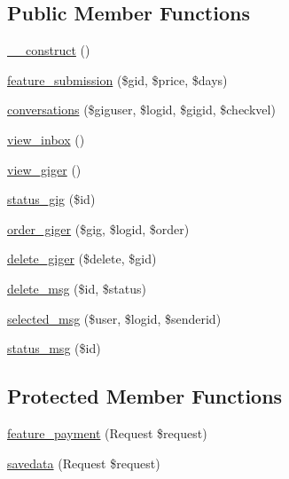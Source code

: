 \subsection*{Public Member Functions}
\begin{DoxyCompactItemize}
\item 
\mbox{\hyperlink{class_responsive_1_1_http_1_1_controllers_1_1_conversations_controller_a095c5d389db211932136b53f25f39685}{\+\_\+\+\_\+construct}} ()
\item 
\mbox{\hyperlink{class_responsive_1_1_http_1_1_controllers_1_1_conversations_controller_a921faa23a279afa2856d43c2d26ca47a}{feature\+\_\+submission}} (\$gid, \$price, \$days)
\item 
\mbox{\hyperlink{class_responsive_1_1_http_1_1_controllers_1_1_conversations_controller_a485a3199a3b013918780405a40c2a22a}{conversations}} (\$giguser, \$logid, \$gigid, \$checkvel)
\item 
\mbox{\hyperlink{class_responsive_1_1_http_1_1_controllers_1_1_conversations_controller_aecbd262429c2f29323f987e3dfb7492e}{view\+\_\+inbox}} ()
\item 
\mbox{\hyperlink{class_responsive_1_1_http_1_1_controllers_1_1_conversations_controller_a5ed047844f3523b725faba37c509cfa8}{view\+\_\+giger}} ()
\item 
\mbox{\hyperlink{class_responsive_1_1_http_1_1_controllers_1_1_conversations_controller_a44785abb897301d19c1d926e986a5d1a}{status\+\_\+gig}} (\$id)
\item 
\mbox{\hyperlink{class_responsive_1_1_http_1_1_controllers_1_1_conversations_controller_a4443ea658fd0a7bd8e7c965dbe01506b}{order\+\_\+giger}} (\$gig, \$logid, \$order)
\item 
\mbox{\hyperlink{class_responsive_1_1_http_1_1_controllers_1_1_conversations_controller_adbb0bfe2b6aeebed2625fb603fd28140}{delete\+\_\+giger}} (\$delete, \$gid)
\item 
\mbox{\hyperlink{class_responsive_1_1_http_1_1_controllers_1_1_conversations_controller_ae83cc7dd192f1277ab3c9fae0b06bc29}{delete\+\_\+msg}} (\$id, \$status)
\item 
\mbox{\hyperlink{class_responsive_1_1_http_1_1_controllers_1_1_conversations_controller_ac026994ca8740ecc3a3963c8036e3964}{selected\+\_\+msg}} (\$user, \$logid, \$senderid)
\item 
\mbox{\hyperlink{class_responsive_1_1_http_1_1_controllers_1_1_conversations_controller_adf1139707745e57d581271a95ccb0439}{status\+\_\+msg}} (\$id)
\end{DoxyCompactItemize}
\subsection*{Protected Member Functions}
\begin{DoxyCompactItemize}
\item 
\mbox{\hyperlink{class_responsive_1_1_http_1_1_controllers_1_1_conversations_controller_a3f2142e6e6fb43d3eaca613ea45be546}{feature\+\_\+payment}} (Request \$request)
\item 
\mbox{\hyperlink{class_responsive_1_1_http_1_1_controllers_1_1_conversations_controller_a39992cc1c190dd16b2de573a70a7f5dc}{savedata}} (Request \$request)
\end{DoxyCompactItemize}


